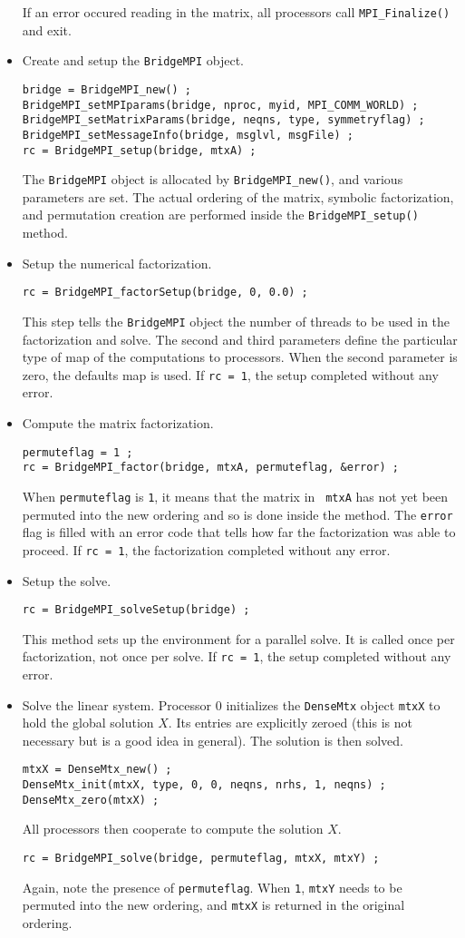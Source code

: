 \begin{itemize}
If an error occured reading in the matrix, all processors call
\texttt{MPI\_Finalize()} and exit.
%
\item Create and setup the {\tt BridgeMPI} object.
\begin{verbatim}
bridge = BridgeMPI_new() ;
BridgeMPI_setMPIparams(bridge, nproc, myid, MPI_COMM_WORLD) ;
BridgeMPI_setMatrixParams(bridge, neqns, type, symmetryflag) ;
BridgeMPI_setMessageInfo(bridge, msglvl, msgFile) ;
rc = BridgeMPI_setup(bridge, mtxA) ;
\end{verbatim}
The {\tt BridgeMPI} object is allocated by {\tt BridgeMPI\_new()},
and various parameters are set.
The actual ordering of the matrix, symbolic factorization,
and permutation creation are performed inside the 
{\tt BridgeMPI\_setup()} method.
%
\item Setup the numerical factorization.
\begin{verbatim}
rc = BridgeMPI_factorSetup(bridge, 0, 0.0) ;
\end{verbatim}
This step tells the \texttt{BridgeMPI} object the number of threads
to be used in the factorization and solve.
The second and third parameters define the particular type 
of map of the computations to processors.
When the second parameter is zero, the defaults map is used.
If {\tt rc = 1}, the setup completed without any error.
%
\item Compute the matrix factorization.
\begin{verbatim}
permuteflag = 1 ;
rc = BridgeMPI_factor(bridge, mtxA, permuteflag, &error) ;
\end{verbatim}
When {\tt permuteflag} is {\tt 1}, it means that the matrix in {\tt
mtxA} has not yet been permuted into the new ordering and so is
done inside the method.
The {\tt error} flag is filled with an error code that tells how far the
factorization was able to proceed.
If {\tt rc = 1}, the factorization completed without any error.
%
\item Setup the solve.
\begin{verbatim}
rc = BridgeMPI_solveSetup(bridge) ;
\end{verbatim}
This method sets up the environment for a parallel solve.
It is called once per factorization, not once per solve.
If {\tt rc = 1}, the setup completed without any error.
%
\item Solve the linear system.
Processor 0 initializes the \texttt{DenseMtx} object {\tt mtxX} to
hold the global solution $X$.
Its entries are explicitly zeroed (this is not necessary but is a good
idea in general).
The solution is then solved.
\begin{verbatim}
mtxX = DenseMtx_new() ;
DenseMtx_init(mtxX, type, 0, 0, neqns, nrhs, 1, neqns) ;
DenseMtx_zero(mtxX) ;
\end{verbatim}
All processors then cooperate to compute the solution $X$.
\begin{verbatim}
rc = BridgeMPI_solve(bridge, permuteflag, mtxX, mtxY) ;
\end{verbatim}
Again, note the presence of {\tt permuteflag}.
When {\tt 1}, \texttt{mtxY} needs to be permuted into the new ordering,
and \texttt{mtxX} is returned in the original ordering.
\end{itemize}
\par

